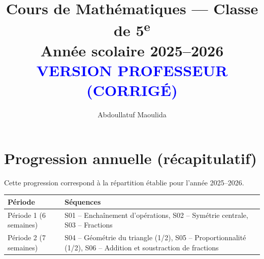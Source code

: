 \documentclass[12pt,a4paper]{book}
\title{Cours de Mathématiques — Classe de 5\textsuperscript{e}\\[0.4em]
\large Année scolaire 2025–2026\\[0.3em]
\normalsize \textcolor{blue}{\textbf{VERSION PROFESSEUR (CORRIGÉ)}}}
\author{Abdoullatuf Maoulida}
\begin{document}
\VersionCorrige
\maketitle
\tableofcontents
\cleardoublepage



\cleardoublepage
\appendix
\chapter{Progression annuelle (récapitulatif)}
Cette progression correspond à la répartition établie pour l'année 2025–2026.

\begin{center}
\begin{tabular}{|l|l|}
\hline
\textbf{Période} & \textbf{Séquences}\\ \hline
Période 1 (6 semaines) & S01 -- Enchaînement d'opérations, S02 -- Symétrie centrale, S03 -- Fractions\\ \hline
Période 2 (7 semaines) & S04 -- Géométrie du triangle (1/2), S05 -- Proportionnalité (1/2), S06 -- Addition et soustraction de fractions\\ \hline
\end{tabular}
\end{center}
\end{document}
